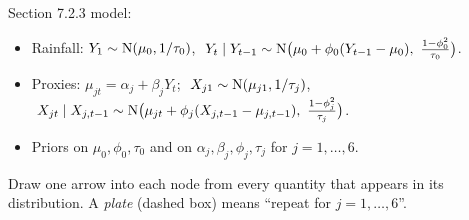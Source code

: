 \documentclass[11pt]{article}
\begin{document}
\begin{recall}
Section 7.2.3 model:
\begin{itemize}
\item Rainfall: $Y_1\sim\mathrm{N}(\mu_0,1/\tau_0)$, $\ Y_t\mid Y_{t-1}\sim\dist N\big(\mu_0+\phi_0(Y_{t-1}-\mu_0),\ \frac{1-\phi_0^2}{\tau_0}\big)$.
\item Proxies: $\mu_{jt}=\alpha_j+\beta_jY_t$; $\ X_{j1}\sim\mathrm{N}(\mu_{j1},1/\tau_j)$, $\ X_{jt}\mid X_{j,t-1}\sim\dist N\big(\mu_{jt}+\phi_j(X_{j,t-1}-\mu_{j,t-1}),\ \frac{1-\phi_j^2}{\tau_j}\big)$.
\item Priors on $\mu_0,\phi_0,\tau_0$ and on $\alpha_j,\beta_j,\phi_j,\tau_j$ for $j=1,\dots,6$.
\end{itemize}
\end{recall}

\begin{keyidea}
Draw one arrow into each node from every quantity that appears in its distribution. A \emph{plate} (dashed box) means ``repeat for $j=1,\dots,6$''.
\end{keyidea}
\end{document}
